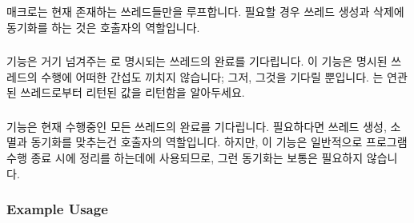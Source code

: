 \subsubsection{}

 매크로는 현재 존재하는 쓰레드들만을 루프합니다.
필요할 경우 쓰레드 생성과 삭제에 동기화를 하는 것은 호출자의 역할입니다.

\subsubsection{}

 기능은 거기 넘겨주는  로 명시되는 쓰레드의
완료를 기다립니다.
이 기능은 명시된 쓰레드의 수행에 어떠한 간섭도 끼치지 않습니다; 그저, 그것을
기다릴 뿐입니다.
 는 연관된 쓰레드로부터 리턴된 값을 리턴함을 알아두세요.

\subsubsection{}

 기능은 현재 수행중인 모든 쓰레드의 완료를 기다립니다.
필요하다면 쓰레드 생성, 소멸과 동기화를 맞추는건 호출자의 역할입니다.
하지만, 이 기능은 일반적으로 프로그램 수행 종료 시에 정리를 하는데에
사용되므로, 그런 동기화는 보통은 필요하지 않습니다.

\subsubsection{Example Usage}

